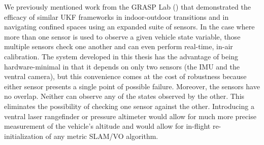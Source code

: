 \begin{comment}
\begin{center}
\begin{tabular}{ m{0.25\textwidth} | m{0.65\textwidth} }
 GPS & Position (and orientation, if using multiple receivers for differential GPS) \\
 Pressure Altimeter & Altitude \\
 3-Axis Magnetometer & Heading angle \\
 Ventral Laser Rangefinder & Altitude \\
 Longitudinal/Lateral Laser Rangefinders & Distance to obstacles \\
 Forward-Facing Camera & Roll angle, distance to obstacles \\
 1D LIDAR & Similar to Laser Rangefinder \\
 Multi-dimensional/Scanning LIDAR & Full 3D map of surroundings, distance to obstacles
\end{tabular}
\end{center}
\end{comment}

We previously mentioned work from the GRASP Lab (\cite{Shen2011}) that demonstrated the efficacy of similar UKF frameworks in indoor-outdoor transitions and in navigating confined spaces using an expanded suite of sensors. In the case where more than one sensor is used to observe a given vehicle state variable, those multiple sensors check one another and can even perform real-time, in-air calibration. The system developed in this thesis has the advantage of being hardware-minimal in that it depends on only two sensors (the IMU and the ventral camera), but this convenience comes at the cost of robustness because either sensor presents a single point of possible failure. Moreover, the sensors have no overlap. Neither can observe any of the states observed by the other. This eliminates the possibility of checking one sensor against the other. Introducing a ventral laser rangefinder or pressure altimeter would allow for much more precise measurement of the vehicle's altitude and would allow for in-flight re-initialization of any metric SLAM/VO algorithm.

